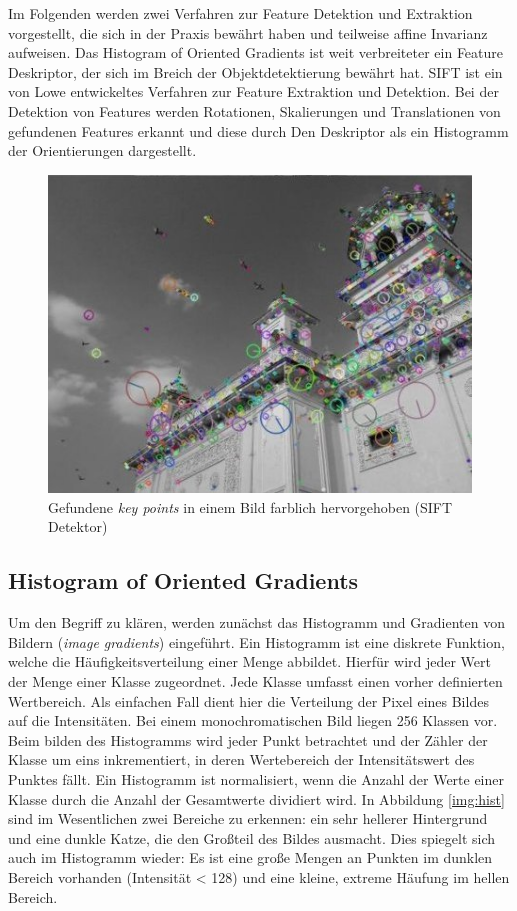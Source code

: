 Im Folgenden werden zwei Verfahren zur Feature Detektion und Extraktion vorgestellt, die sich in der Praxis bewährt haben und teilweise affine Invarianz aufweisen. Das Histogram of Oriented Gradients ist weit verbreiteter ein Feature Deskriptor, der sich im Breich der Objektdetektierung bewährt hat. SIFT ist ein von Lowe entwickeltes Verfahren zur Feature Extraktion und Detektion. Bei der Detektion von Features werden Rotationen, Skalierungen und Translationen von gefundenen Features erkannt und diese durch Den Deskriptor als ein Histogramm der Orientierungen dargestellt.\cite{ifd2016}

\begin{figure}
	\centering
	\includegraphics[scale=0.7]{images/sift_keypoints.jpg}
	\caption{Gefundene \textit{key points} in einem Bild farblich hervorgehoben (SIFT Detektor)}
	\label{img:interset_points}
\end{figure}

\subsection{Histogram of Oriented Gradients}

Um den Begriff zu klären, werden zunächst das Histogramm und Gradienten von Bildern (\textit{image gradients}) eingeführt. Ein Histogramm ist eine diskrete Funktion, welche die Häufigkeitsverteilung einer Menge abbildet. Hierfür wird jeder Wert der Menge einer Klasse zugeordnet. Jede Klasse umfasst einen vorher definierten Wertbereich. Als einfachen Fall dient hier die Verteilung der Pixel eines Bildes auf die Intensitäten. Bei einem monochromatischen Bild liegen 256 Klassen vor. Beim bilden des Histogramms wird jeder Punkt betrachtet und der Zähler der Klasse um eins inkrementiert, in deren Wertebereich der Intensitätswert des Punktes fällt. Ein Histogramm ist normalisiert, wenn die Anzahl der Werte einer Klasse durch die Anzahl der Gesamtwerte dividiert wird.
In Abbildung \ref{img:hist} sind im Wesentlichen zwei Bereiche zu erkennen: ein sehr hellerer Hintergrund und eine dunkle Katze, die den Großteil des Bildes ausmacht. Dies spiegelt sich auch im Histogramm wieder: Es ist eine große Mengen an Punkten im dunklen Bereich vorhanden (Intensität < 128) und eine kleine, extreme Häufung im hellen Bereich.

